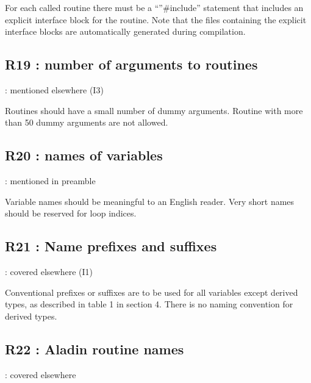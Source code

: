\documentclass[letterpaper,10pt,english]{sphinxmanual}
\begin{document}
\sphinxAtStartPar
For each called routine there must be a “”\#include” statement that includes an explicit interface block for the routine.
Note that the files containing the explicit interface blocks are automatically generated during compilation.

\sphinxstepscope


\subsection{R19 : number of arguments to routines}
\label{\detokenize{obsolescent/r19:r19-number-of-arguments-to-routines}}\label{\detokenize{obsolescent/r19::doc}}
\sphinxAtStartPar
{} : mentioned elsewhere (I3)

\sphinxAtStartPar
Routines should have a small number of dummy arguments.
Routine with more than 50 dummy arguments are not allowed.

\sphinxstepscope


\subsection{R20 : names of variables}
\label{\detokenize{obsolescent/r20:r20-names-of-variables}}\label{\detokenize{obsolescent/r20::doc}}
\sphinxAtStartPar
{} : mentioned in preamble

\sphinxAtStartPar
Variable names should be meaningful to an English reader.
Very short names should be reserved for loop indices.

\sphinxstepscope


\subsection{R21 :  Name prefixes and suffixes}
\label{\detokenize{obsolescent/r21:r21-name-prefixes-and-suffixes}}\label{\detokenize{obsolescent/r21::doc}}
\sphinxAtStartPar
{} : covered elsewhere (I1)

\sphinxAtStartPar
Conventional prefixes or suffixes are to be used for all variables except derived types,
as described in table 1 in section 4.
There is no naming convention for derived types.

\sphinxstepscope


\subsection{R22 : Aladin routine names}
\label{\detokenize{obsolescent/r22:r22-aladin-routine-names}}\label{\detokenize{obsolescent/r22::doc}}
\sphinxAtStartPar
{} : covered elsewhere
\end{document}
